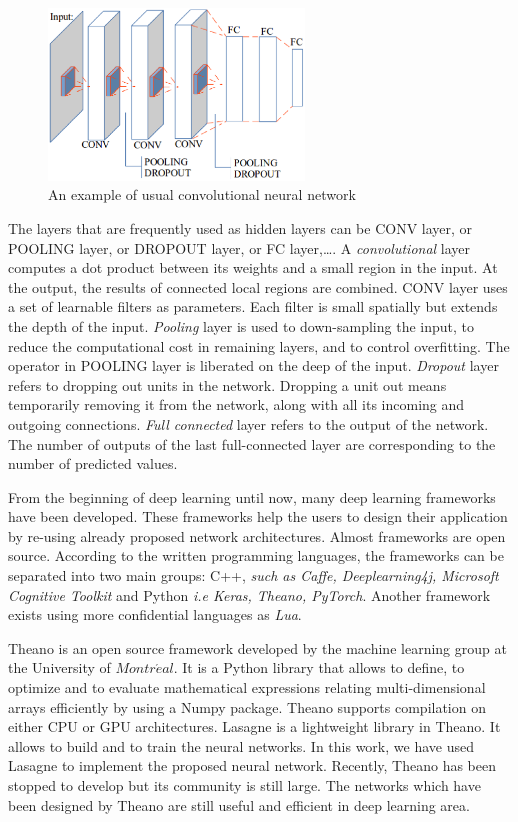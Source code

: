 \documentclass{article} %
\begin{document}
\begin{multicols}{2}
\begin{figure}[H]
	\centerline{\includegraphics[height=1.8in]{images/convarc.eps}}
	\caption{\footnotesize{An example of usual convolutional neural network}}
	\label{figconvarc}
\end{figure}

The layers that are frequently used as hidden layers can be CONV layer, or POOLING layer, or DROPOUT layer, or FC layer,\ldots. A \textit{convolutional} layer computes a dot product between its weights and a small region in the input. At the output, the results of connected local regions are combined. CONV layer uses a set of learnable filters as parameters. Each filter is small spatially but extends the depth of the input. \textit{Pooling} layer is used to down-sampling the input, to reduce the computational cost in remaining layers, and to control overfitting. The operator in POOLING layer is liberated on the deep of the input. \textit{Dropout} layer refers to dropping out units in the network. Dropping a unit out means temporarily removing it from the network, along with all its incoming and outgoing connections. \textit{Full connected} layer refers to the output of the network. The number of outputs of the last full-connected layer are corresponding to the number of predicted values.

From the beginning of deep learning until now, many deep learning frameworks have been developed.
These frameworks help the users to design their application by re-using already proposed network architectures. Almost frameworks are open source. According to the written programming languages, the frameworks can be separated into two main groups: C++, \textit{such as Caffe, Deeplearning4j, Microsoft Cognitive Toolkit} and Python \textit{i.e Keras, Theano, PyTorch}. Another framework exists using more confidential languages as \textit{Lua}.

Theano \cite{theanoframework} is an open source framework developed by the machine learning group at the University of $Montr\acute{e}al$. It is a Python library that allows to define, to optimize and to evaluate mathematical expressions relating multi-dimensional arrays efficiently by using a Numpy package. Theano supports compilation on either CPU or GPU architectures. Lasagne \cite{lasagne} is a lightweight library in Theano. It allows to build and to train the neural networks. In this work, we have used Lasagne to implement the proposed neural network. Recently, Theano has been stopped to develop but its community is still large. The networks which have been designed by Theano are still useful and efficient in deep learning area.

\end{multicols}
\end{document}
